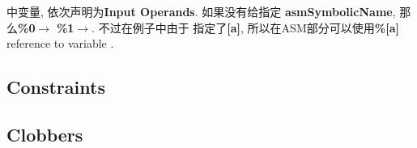 中变量, 依次声明为{\bf Input Operands}. 如果没有给指定%
{\bf asmSymbolicName}, 那么{\bf \%0}$\rightarrow$ {\bf \%1}$\rightarrow$. 不过在例子中由于%
指定了{\bf [a]}, 所以在ASM部分可以使用{\bf \%[a]} reference to variable .

\subsection{Constraints}

\subsection{Clobbers}
